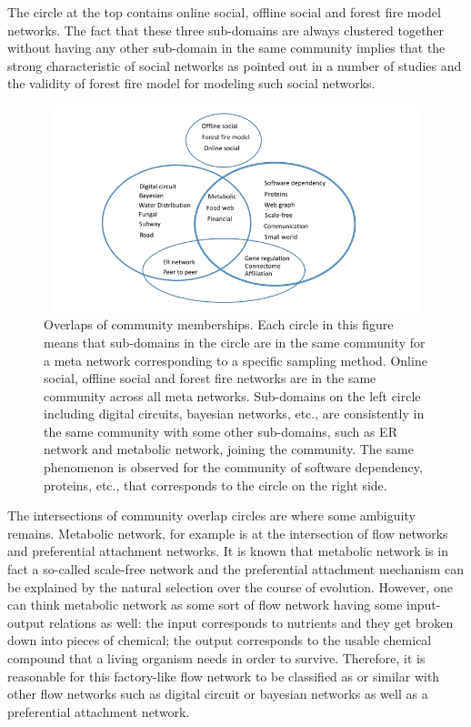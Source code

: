 \documentclass{article}
\begin{document}
The circle at the top contains online social, offline social and forest fire model networks. The fact that these three sub-domains are always clustered together without having any other sub-domain in the same community implies that the strong characteristic of social networks as pointed out in a number of studies and the validity of forest fire model for modeling such social networks.

\begin{figure}[ht]
		\begin{center}
		\vspace{0.5cm}
		\includegraphics[clip,width=12cm,height = 6cm]{figs/community_overlaps.png}
		\vspace{0.5cm}
		\caption{Overlaps of community memberships. Each circle in this figure means that sub-domains in the circle are in the same community for a meta network corresponding to a specific sampling method. Online social, offline social and forest fire networks are in the same community across all meta networks. Sub-domains on the left circle including digital circuits, bayesian networks, etc., are consistently in the same community with some other sub-domains, such as ER network and metabolic network, joining the community. The same phenomenon is observed for the community of software dependency, proteins, etc., that corresponds to the circle on the right side.}
		\label{community_overlaps}
 		\end{center}
\end{figure}

The intersections of community overlap circles are where some ambiguity remains. Metabolic network, for example is at the intersection of flow networks and preferential attachment networks. It is known that metabolic network is in fact a so-called scale-free network and the preferential attachment mechanism can be explained by the natural selection over the course of evolution. However, one can think metabolic network as some sort of flow network having some input-output relations as well: the input corresponds to nutrients and they get broken down into pieces of chemical; the output corresponds to the usable chemical compound that a living organism needs in order to survive. Therefore, it is reasonable for this factory-like flow network to be classified as or similar with other flow networks such as digital circuit or bayesian networks as well as a preferential attachment network. 
\end{document}
